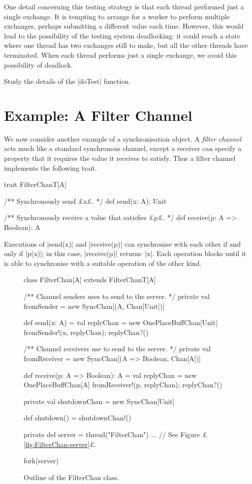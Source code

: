 One detail concerning this testing strategy is that each thread performed just
a single exchange.  It is tempting to arrange for a worker to perform multiple
exchanges, perhaps submitting a different value each time.  However, this would
lead to the possibility of the testing system deadlocking: it could reach a
state where one thread has two exchanges still to make, but all the other
threads have terminated.  When each thread performs just a single exchange, we
avoid this possibility of deadlock. 

\begin{instruction}
Study the details of the |doTest| function.
\end{instruction}


\section{Example: A Filter Channel}
\label{sec:filter-chan}

We now consider another example of a synchronisation object.  A \emph{filter
  channel} acts much like a standard synchronous channel, except a receiver
can specify a property that it requires the value it receives to satisfy.
Thus a filter channel implements the following trait.
%
\begin{scala}
trait FilterChanT[A]{
  /** Synchronously send £x£. */
  def send(x: A): Unit

  /** Synchronously receive a value that satisfies £p£. */
  def receive(p: A => Boolean): A 
}
\end{scala}
%
Executions of |send(x)| and |receive(p)| can synchronise with each other
if and only if |p(x)|; in this case, |receive(p)| returns~|x|.  Each operation
blocks until it is able to synchronise with a suitable operation of the other
kind. 


\begin{figure}
\begin{scala}
class FilterChan[A] extends FilterChanT[A]{
  /** Channel senders uses to send to the server. */
  private val fromSender = new SyncChan[(A, Chan[Unit])]

  def send(x: A) = { 
    val replyChan = new OnePlaceBuffChan[Unit]
    fromSender!(x, replyChan); replyChan?()
  }

  /** Channel receivers use to send to the server. */
  private val fromReceiver = new SyncChan[(A => Boolean, Chan[A])]
  
  def receive(p: A => Boolean): A = {
    val replyChan = new OnePlaceBuffChan[A]
    fromReceiver!(p, replyChan); replyChan?()
  }

  private val shutdownChan = new SyncChan[Unit]

  def shutdown() = shutdownChan!() 

  private def server = thread("FilterChan"){ ... } // See Figure £\ref{fig:FilterChan-server}£.

  fork(server)
}
\end{scala}
\caption{Outline of the {\scalashape FilterChan} class.}
\label{fig:FilterChan}
\end{figure}

